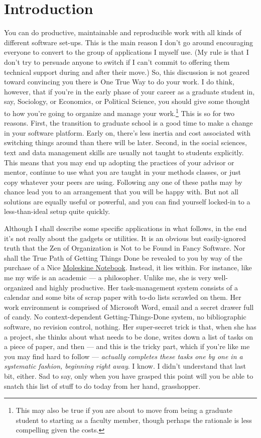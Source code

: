 \documentclass[11pt,article,oneside]{memoir}
\begin{document}
\section{Introduction} %
\label{sec:introduction}
You can do productive, maintainable and reproducible work with all kinds of different software set-ups. This is the main reason I don't go around encouraging everyone to convert to the group of applications I myself use. (My rule is that I don't try to persuade anyone to switch if I can't commit to offering them technical support during and after their move.) So, this discussion is not geared toward convincing you there is One True Way to do your work. I do think, however, that if you're in the early phase of your career as a graduate student in, say, Sociology, or Economics, or Political Science, you should give some thought to how you're going to organize and manage your work.\footnote{This may also be true if you are about to move from being a graduate student to starting as a faculty member, though perhaps the rationale is less compelling given the costs.} This is so for two reasons. First, the transition to graduate school is a good time to make a change in your software platform. Early on, there's less inertia and cost associated with switching things around than there will be later. Second, in the social sciences, text and data management skills are usually not taught to students explicitly. This means that you may end up adopting the practices of your advisor or mentor, continue to use what you are taught in your methods classes, or just copy whatever your peers are using. Following any one of these paths may by chance lead you to an arrangement that you will be happy with. But not all solutions are equally useful or powerful, and you can find yourself locked-in to a less-than-ideal setup quite quickly.

Although I shall describe some specific applications in what follows, in the end it's not really about the gadgets or utilities. It is an obvious but easily-ignored truth that the Zen of Organization is Not to be Found in Fancy Software. Nor shall the True Path of Getting Things Done be revealed to you by way of the purchase of a Nice \href{http://www.moleskineus.com/}{Moleskine Notebook}. Instead, it lies within. For instance, like me my wife is an academic --- a philosopher. Unlike me, she is very well-organized and highly productive. Her task-management system consists of a calendar and some bits of scrap paper with to-do lists scrawled on them. Her work environment is comprised of Microsoft Word, email and a secret drawer full of candy. No context-dependent Getting-Things-Done system, no bibliographic software, no revision control, nothing. Her super-secret trick is that, when she has a project, she thinks about what needs to be done, writes down a list of tasks on a piece of paper, and then --- and this is the tricky part, which if you're like me you may find hard to follow --- \emph{actually completes these tasks one by one in a systematic fashion, beginning right away}. I know. I didn't understand that last bit, either. Sad to say, only when you have grasped this point will you be able to snatch this list of stuff to do today from her hand, grasshopper. 
\end{document}
